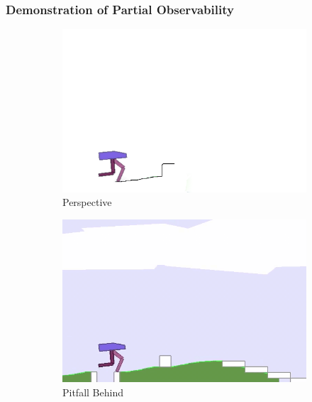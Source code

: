 \documentclass{beamer}
\begin{document}
\begin{frame}
\frametitle{Demonstration of Partial Observability}
\begin{figure}
	\begin{subfigure}{.32\textwidth}
		\centering
		\includegraphics[width=0.99\linewidth]{figures/bipedal/po/lidarcover.png}
		\caption{Perspective}
		\label{fig:lidar_cover}
	\end{subfigure}
	\begin{subfigure}{.32\textwidth}
		\centering
		\includegraphics[width=0.99\linewidth]{figures/bipedal/po/pitfall_behind.png}
		\caption{Pitfall Behind}
		\label{fig:pitfall_behind}
	\end{subfigure}
	\begin{subfigure}{.32\textwidth}
		\centering

\end{subfigure}
\end{figure}
\end{frame}
\end{document}

